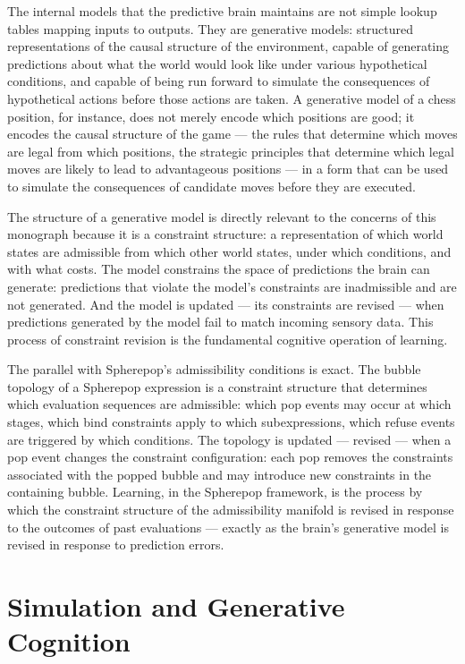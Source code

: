 \documentclass[12pt,openany]{book}
\theoremstyle{plain}
\theoremstyle{definition}
\theoremstyle{remark}
\begin{document}
The internal models that the predictive brain maintains are not simple lookup tables mapping inputs to outputs. They are generative models: structured representations of the causal structure of the environment, capable of generating predictions about what the world would look like under various hypothetical conditions, and capable of being run forward to simulate the consequences of hypothetical actions before those actions are taken. A generative model of a chess position, for instance, does not merely encode which positions are good; it encodes the causal structure of the game — the rules that determine which moves are legal from which positions, the strategic principles that determine which legal moves are likely to lead to advantageous positions — in a form that can be used to simulate the consequences of candidate moves before they are executed.

The structure of a generative model is directly relevant to the concerns of this monograph because it is a constraint structure: a representation of which world states are admissible from which other world states, under which conditions, and with what costs. The model constrains the space of predictions the brain can generate: predictions that violate the model's constraints are inadmissible and are not generated. And the model is updated — its constraints are revised — when predictions generated by the model fail to match incoming sensory data. This process of constraint revision is the fundamental cognitive operation of learning.

The parallel with Spherepop's admissibility conditions is exact. The bubble topology of a Spherepop expression is a constraint structure that determines which evaluation sequences are admissible: which pop events may occur at which stages, which bind constraints apply to which subexpressions, which refuse events are triggered by which conditions. The topology is updated — revised — when a pop event changes the constraint configuration: each pop removes the constraints associated with the popped bubble and may introduce new constraints in the containing bubble. Learning, in the Spherepop framework, is the process by which the constraint structure of the admissibility manifold is revised in response to the outcomes of past evaluations — exactly as the brain's generative model is revised in response to prediction errors.

\section{Simulation and Generative Cognition}
\end{document}
